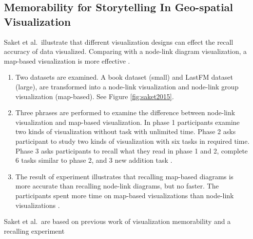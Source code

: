 \documentclass{egpubl}
\begin{document}
\subsection{Memorability for Storytelling In Geo-spatial Visualization}
Saket et al.\ illustrate that different visualization designs can effect the recall accuracy of data visualized. Comparing with a node-link diagram visualization, a map-based visualization is more effective \cite{saket2015}.
\begin{enumerate}
\item Two datasets are examined. A book dataset (small) and LastFM dataset (large), are transformed into a node-link visualization and node-link group visualization (map-based). See Figure \ref{fig:saket2015}.
\item Three phrases are performed to examine the difference between node-link visualization and map-based visualization. In phase 1 participants examine two kinds of visualization without task with unlimited time. Phase 2 asks participant to study two kinds of visualization with six tasks in required time. Phase 3 asks participants to recall what they read in phase 1 and 2, complete 6 tasks similar to phase 2, and 3 new addition task \cite{saket2015}.
\item The result of experiment illustrates that recalling map-based diagrams is more accurate than recalling node-link diagrams, but no faster.
The participants spent more time on map-based visualizations than node-link visualizations \cite{saket2015}.  
\end{enumerate}
Saket et al.\ are based on previous work of visualization memorability \cite{bateman} and a recalling experiment \cite{isola2011}
\end{document}
